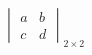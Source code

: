 \documentclass[border=2pt,varwidth=true]{standalone}
\begin{document}
\begin{displaymath}
\begin{vmatrix} a & b \\ c & d \end{vmatrix}_{2 \times 2 }
\end{displaymath}
\end{document}
